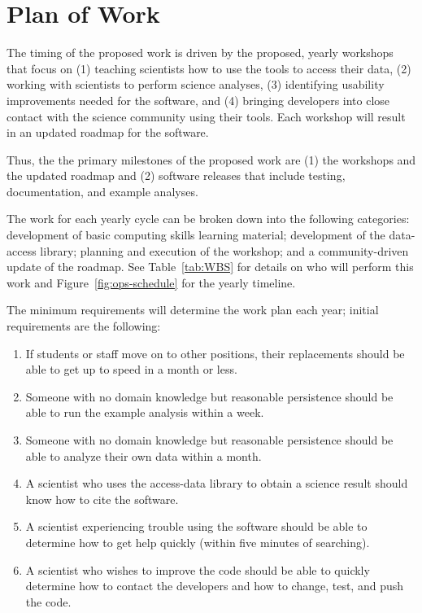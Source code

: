 \section{Plan of Work}
\label{sec:planofwork}


The timing of the proposed work is driven by the proposed, yearly workshops that focus on (1) teaching scientists how to use the tools to access their data, (2) working with scientists to perform science analyses, (3) identifying usability improvements needed for the software, and (4) bringing developers into close contact with the science community using their tools.  Each workshop will result in an updated roadmap for the software.

Thus, the the primary milestones of the proposed work are (1) the workshops and the updated roadmap and (2) software releases that include testing, documentation, and example analyses.

The work for each yearly cycle can be broken down into the following categories: development of basic computing skills learning material; development of the data-access library; planning and execution of the workshop; and a community-driven update of the roadmap.  See Table~\ref{tab:WBS} for details on who will perform this work and Figure~\ref{fig:ops-schedule} for the yearly timeline.

The minimum requirements will determine the work plan each year; initial requirements are the following:

\begin{enumerate}
    \item If students or staff move on to other positions, their replacements should be able to get up to speed in a month or less.
    \item Someone with no domain knowledge but reasonable persistence should be able to run the example analysis within a week.
    \item Someone with no domain knowledge but reasonable persistence should be able to analyze their own data within a month.
    \item A scientist who uses the access-data library to obtain a science result should know how to cite the software.
    \item A scientist experiencing trouble using the software should be able to determine how to get help quickly (within five minutes of searching).
    \item A scientist who wishes to improve the code should be able to quickly determine how to contact the developers and how to change, test, and push the code.
\end{enumerate}

